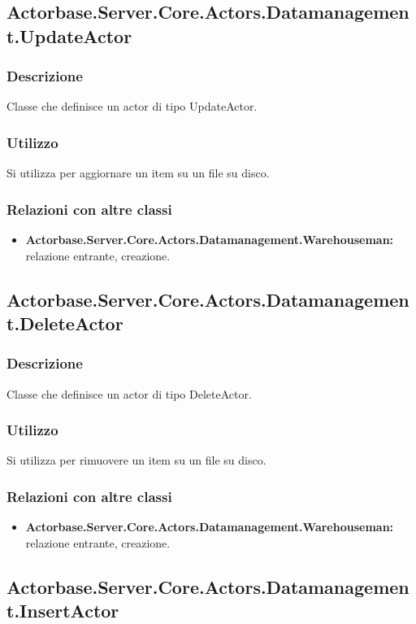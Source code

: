 \documentclass[a4paper]{article}
\begin{document}
		\subsection{Actorbase.Server.Core.Actors.Datamanagement.UpdateActor}
			\subsubsection{Descrizione}
				Classe che definisce un actor di tipo UpdateActor.
			\subsubsection{Utilizzo}
				Si utilizza per aggiornare un item su un file su disco.
			\subsubsection{Relazioni con altre classi}
				\begin{itemize}
				    \item \textbf{Actorbase.Server.Core.Actors.Datamanagement.Warehouseman:} relazione entrante, creazione.
                \end{itemize}
			
		\subsection{Actorbase.Server.Core.Actors.Datamanagement.DeleteActor}
			\subsubsection{Descrizione}
				Classe che definisce un actor di tipo DeleteActor.
			\subsubsection{Utilizzo}
				Si utilizza per rimuovere un item su un file su disco. 
			\subsubsection{Relazioni con altre classi}
				\begin{itemize}
				    \item \textbf{Actorbase.Server.Core.Actors.Datamanagement.Warehouseman:} relazione entrante, creazione.
                \end{itemize}
			
		\subsection{Actorbase.Server.Core.Actors.Datamanagement.InsertActor}
\end{document}
